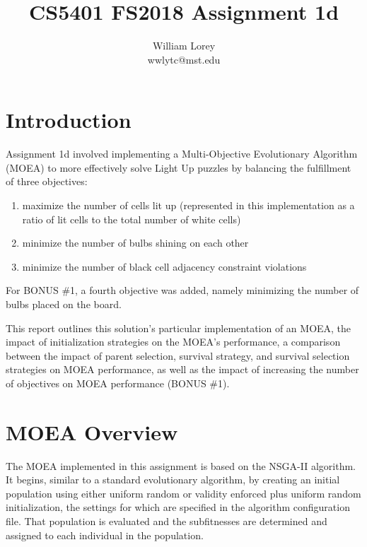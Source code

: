 \documentclass[11pt]{article}
\title{CS5401 FS2018 Assignment 1d}
\author{William  Lorey \\ wwlytc@mst.edu}
\date{}
\begin{document}
\maketitle

\tableofcontents

\section{Introduction}

Assignment 1d involved implementing a Multi-Objective Evolutionary Algorithm (MOEA)
to more effectively solve Light Up puzzles by balancing the fulfillment of three
objectives: 

\begin{enumerate}

    \item maximize the number of cells lit up (represented in this implementation
    as a ratio of lit cells to the total number of white cells)

    \item minimize the number of bulbs shining on each other

    \item minimize the number of black cell adjacency constraint violations

\end{enumerate}

For BONUS \#1, a fourth objective was added, namely minimizing the number of bulbs
placed on the board.

This report outlines this solution's particular
implementation of an MOEA, the impact of initialization strategies on the MOEA's 
performance, a comparison between the impact of parent selection, survival strategy, and survival
selection strategies on MOEA performance, as well as the impact of increasing the
number of objectives on MOEA performance (BONUS \#1).


\section{MOEA Overview}

The MOEA implemented in this assignment is based on the NSGA-II algorithm. It begins,
similar to a standard evolutionary algorithm, by creating an initial population using
either uniform random or validity enforced plus uniform random initialization, the 
settings for which are specified in the algorithm configuration file. That population
is evaluated and the subfitnesses are determined and assigned to each individual 
in the population.
\end{document}
